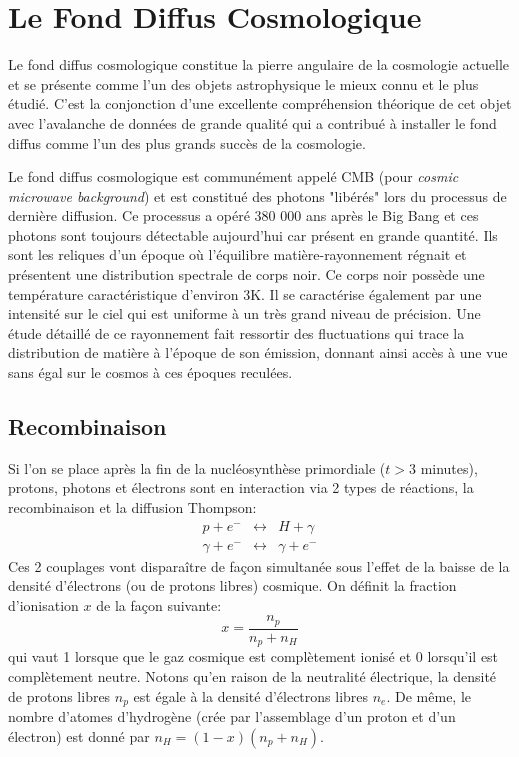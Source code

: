 
\chapter{Le Fond Diffus Cosmologique}

Le fond diffus cosmologique constitue la pierre angulaire de la cosmologie actuelle et se présente comme l'un des objets astrophysique le mieux connu et le plus étudié. C'est la conjonction d'une excellente compréhension théorique de cet objet avec l'avalanche de données de grande qualité qui a contribué à installer le fond diffus comme l'un des plus grands succès de la cosmologie.

Le fond diffus cosmologique est communément appelé CMB (pour \textit{cosmic microwave background}) et est constitué des photons "libérés" lors du processus de dernière diffusion. Ce processus a opéré 380 000 ans après le Big Bang et ces photons sont toujours détectable aujourd'hui car présent en grande quantité. Ils sont les reliques d'un époque où l'équilibre matière-rayonnement régnait et présentent une distribution spectrale de corps noir. Ce corps noir possède une température caractéristique d'environ 3K. Il se caractérise également par une intensité sur le ciel qui est uniforme à un très grand niveau de précision. Une étude détaillé de ce rayonnement fait ressortir des fluctuations qui trace la distribution de matière à l'époque de son émission, donnant ainsi accès à une vue sans égal sur le cosmos à ces époques reculées.

\section{Recombinaison}
Si l'on se place après la fin de la nucléosynthèse primordiale ($t>3$ minutes), protons, photons et électrons sont en interaction via 2 types de réactions, la recombinaison et la diffusion Thompson:
\begin{eqnarray}
p + e^- &\leftrightarrow& H+ \gamma\label{e:rec}\\
\gamma +e^- &\leftrightarrow& \gamma +e^- 
\end{eqnarray}
Ces 2 couplages vont disparaître de façon simultanée sous l'effet de la baisse de la densité d'électrons (ou de protons libres) cosmique. On définit la fraction d'ionisation $x$ de la façon suivante:
\begin{equation}
x=\frac{n_p}{n_p+n_H}
\end{equation} 
qui vaut 1 lorsque que le gaz cosmique est complètement ionisé et 0 lorsqu'il est complètement neutre. Notons qu'en raison de la neutralité électrique, la densité de protons libres $n_p$ est égale à la densité d'électrons libres $n_e$. De même, le nombre d'atomes d'hydrogène (crée par l'assemblage d'un proton et d'un électron) est donné par $n_H=(1-x) (n_p+n_H)$. 

